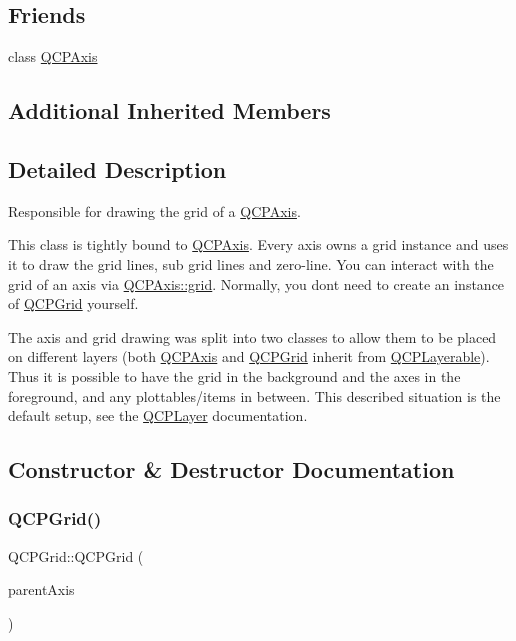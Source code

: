 \subsection*{Friends}
\begin{DoxyCompactItemize}
\item 
class \hyperlink{class_q_c_p_grid_af123edeca169ec7a31958a1d714e1a8a}{Q\+C\+P\+Axis}
\end{DoxyCompactItemize}
\subsection*{Additional Inherited Members}


\subsection{Detailed Description}
Responsible for drawing the grid of a \hyperlink{class_q_c_p_axis}{Q\+C\+P\+Axis}. 

This class is tightly bound to \hyperlink{class_q_c_p_axis}{Q\+C\+P\+Axis}. Every axis owns a grid instance and uses it to draw the grid lines, sub grid lines and zero-\/line. You can interact with the grid of an axis via \hyperlink{class_q_c_p_axis_a63f1dd2df663680d2a8d06c19592dd63}{Q\+C\+P\+Axis\+::grid}. Normally, you don\textquotesingle{}t need to create an instance of \hyperlink{class_q_c_p_grid}{Q\+C\+P\+Grid} yourself.

The axis and grid drawing was split into two classes to allow them to be placed on different layers (both \hyperlink{class_q_c_p_axis}{Q\+C\+P\+Axis} and \hyperlink{class_q_c_p_grid}{Q\+C\+P\+Grid} inherit from \hyperlink{class_q_c_p_layerable}{Q\+C\+P\+Layerable}). Thus it is possible to have the grid in the background and the axes in the foreground, and any plottables/items in between. This described situation is the default setup, see the \hyperlink{class_q_c_p_layer}{Q\+C\+P\+Layer} documentation. 

\subsection{Constructor \& Destructor Documentation}
\mbox{\label{class_q_c_p_grid_acd1cdd2909625388a13048b698494a17}} 
\subsubsection{\texorpdfstring{Q\+C\+P\+Grid()}{QCPGrid()}}
{\footnotesize\ttfamily Q\+C\+P\+Grid\+::\+Q\+C\+P\+Grid (\begin{DoxyParamCaption}\item[{\hyperlink{class_q_c_p_axis}{Q\+C\+P\+Axis} $\ast$}]{parent\+Axis }\end{DoxyParamCaption})\hspace{0.3cm}{\ttfamily [explicit]}}

